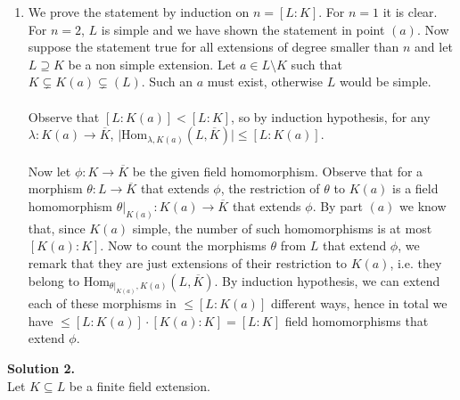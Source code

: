 \documentclass[12pt,a4paper]{article}
\begin{document}
\begin{enumerate}[label = (\alph*)]
	\item We prove the statement by induction on $n=[L:K]$. For $n=1$ it is clear. For $n=2$, $L$ is simple and we have shown the statement in point $(a)$. Now suppose the statement true for all extensions of degree smaller than $n$ and let $L\supseteq K$ be a non simple extension. 
	Let $a\in L\setminus K$ such that $K\subsetneq K(a)\subsetneq(L)$. Such an $a$ must exist, otherwise $L$ would be simple.\\
	\\
	Observe that $[L:K(a)]<[L:K]$, so by induction hypothesis, for any $\lambda:K(a)\rightarrow \overline{K}$, $|$Hom$_{\lambda, K(a)}(L,\overline{K})|\leq [L:K(a)]$. \\
	\\
	Now let $\phi: K\rightarrow \overline{K}$ be the given field homomorphism. Observe that for a morphism $\theta: L\rightarrow \overline{K}$ that extends $\phi$, the restriction of $\theta$ to $K(a)$ is a field homomorphism $\theta|_{K(a)}:K(a)\rightarrow \overline{K}$ that extends $\phi$. By part $(a)$ we know that, since $K(a)$ simple, the number of such homomorphisms is at most $[K(a):K]$.
	Now to count the morphisms $\theta$ from $L$ that extend $\phi$, we remark that they are just extensions of their restriction to $K(a)$, i.e. they belong to Hom$_{\theta|_{K(a)}, K(a)}(L,\overline{K})$.  By induction hypothesis, we can extend each of these morphisms in $\leq [L:K(a)]$ different ways, hence in total we have $\leq [L:K(a)]\cdot[K(a):K] = [L:K]$ field homomorphisms that extend $\phi$. 
	
	
\end{enumerate}

\noindent
\textbf{Solution 2.}\\
Let $K\subseteq L$ be a finite field extension.
\end{document}
